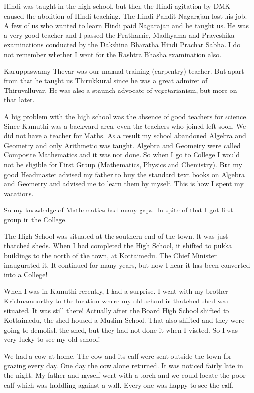 Hindi was taught in the high school, but then the Hindi agitation by DMK 
caused the abolition of Hindi teaching. The Hindi Pandit Nagarajan lost 
his job. A few of us who wanted to learn Hindi paid Nagarajan and he 
taught us. He was a very good teacher and I passed the Prathamic, 
Madhyama and Praveshika examinations conducted by the Dakshina Bharatha 
Hindi Prachar Sabha. I do not remember whether I went for the Rashtra 
Bhasha examination also.

Karuppaswamy Thevar was our manual training (carpentry) teacher. But 
apart from that he taught us Thirukkural since he was a great admirer of 
Thiruvalluvar. He was also a staunch advocate of vegetarianism, but more 
on that later.
 
A big problem with the high school was the absence of good teachers for 
science. Since Kamuthi was a backward area, even the teachers who joined 
left soon. We did not have a teacher for Maths. As a result my school 
abandoned Algebra and Geometry and only Arithmetic was taught. Algebra 
and Geometry were called Composite Mathematics and it was not done. So 
when I go to College I would not be eligible for First Group 
(Mathematics, Physics and Chemistry). But my good Headmaster advised my 
father to buy the standard text books on Algebra and Geometry and 
advised me to learn them by myself. This is how I spent my vacations.

So my knowledge of Mathematics had many gaps. In spite of that I got 
first group in the College.

The High School was situated at the southern end of the town. It was 
just thatched sheds. When I had completed the High School, it shifted to 
pukka buildings to the north of the town, at Kottaimedu. The Chief 
Minister inaugurated it. It continued for many years, but now I hear it 
has been converted into a College!

When I was in Kamuthi recently, I had a surprise. I went with my brother 
Krishnamoorthy to the location where my old school in thatched shed was 
situated. It was still there! Actually after the Board High School 
shifted to Kottaimedu, the shed housed a Muslim School. That also 
shifted and they were going to demolish the shed, but they had not done 
it when I visited. So I was very lucky to see my old school!

We had a cow at home. The cow and its calf were sent outside the town 
for grazing every day. One day the cow alone returned. It was noticed 
fairly late in the night. My father and myself went with a torch and we 
could locate the poor calf which was huddling against a wall. Every one 
was happy to see the calf.

